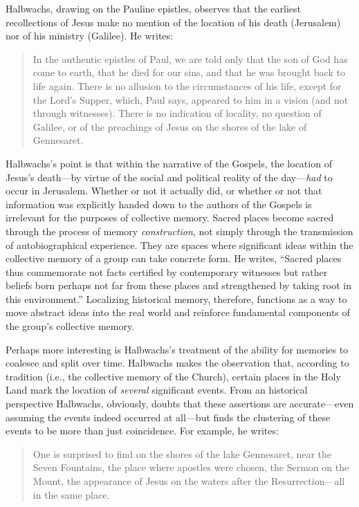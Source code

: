 Halbwachs, drawing on the Pauline epistles, observes that the earliest
recollections of Jesus make no mention of the location of his death
(Jerusalem) nor of his ministry (Galilee). He writes:

\begin{quote}
In the authentic epistles of Paul, we are told only that the son of God
has come to earth, that he died for our sins, and that he was brought
back to life again. There is no allusion to the circumstances of his
life, except for the Lord's Supper, which, Paul says, appeared to him in
a vision (and not through witnesses). There is no indication of
locality, no question of Galilee, or of the preachings of Jesus on the
shores of the lake of Gennesaret.\autocite[209]{halbwachs1992}
\end{quote}

Halbwachs's point is that within the narrative of the Gospels, the
location of Jesus's death---by virtue of the social and political
reality of the day---\emph{had} to occur in
Jerusalem.\autocite[211]{halbwachs1992} Whether or not it actually did,
or whether or not that information was explicitly handed down to the
authors of the Gospels is irrelevant for the purposes of collective
memory. Sacred places become sacred through the process of memory
\emph{construction}, not simply through the transmission of
autobiographical experience. They are spaces where significant ideas
within the collective memory of a group can take concrete form. He
writes, ``Sacred places thus commemorate not facts certified by
contemporary witnesses but rather beliefs born perhaps not far from
these places and strengthened by taking root in this
environment.''\autocite[199]{halbwachs1992} Localizing historical
memory, therefore, functions as a way to move abstract ideas into the
real world and reinforce fundamental components of the group's
collective memory.

Perhaps more interesting is Halbwachs's treatment of the ability for
memories to coalesce and split over time. Halbwachs makes the
observation that, according to tradition (i.e., the collective memory of
the Church), certain places in the Holy Land mark the location of
\emph{several} significant events. From an historical perspective
Halbwachs, obviously, doubts that these assertions are accurate---even
assuming the events indeed occurred at all---but finds the clustering of
these events to be more than just coincidence. For example, he writes:

\begin{quote}
One is surprised to find on the shores of the lake Gennesaret, near the
Seven Fountains, the place where apostles were chosen, the Sermon on the
Mount, the appearance of Jesus on the waters after the
Resurrection---all in the same place.\autocite[220]{halbwachs1992}
\end{quote}

